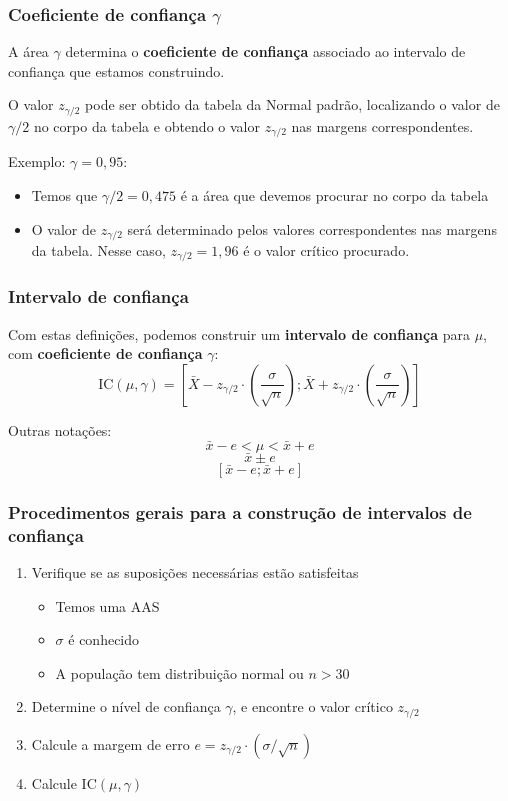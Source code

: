 \documentclass[11pt]{beamer}
\begin{document}
\begin{frame}
\frametitle{Coeficiente de confiança \(\gamma\)}

A área \(\gamma\) determina o \textbf{coeficiente de confiança}
associado ao intervalo de confiança que estamos construindo.

O valor \(z_{\gamma/2}\) pode ser obtido da tabela da Normal padrão,
localizando o valor de \(\gamma/2\) no corpo da tabela e obtendo o valor
\(z_{\gamma/2}\) nas margens correspondentes.

Exemplo: \(\gamma = 0,95\):

\begin{itemize}
\item
  Temos que \(\gamma/2 = 0,475\) é a área que devemos procurar no corpo
  da tabela
\item
  O valor de \(z_{\gamma/2}\) será determinado pelos valores
  correspondentes nas margens da tabela. Nesse caso,
  \(z_{\gamma/2} = 1,96\) é o valor crítico procurado.
\end{itemize}
\end{frame}

\begin{frame}
\frametitle{Intervalo de confiança}

Com estas definições, podemos construir um \textbf{intervalo de
confiança} para \(\mu\), com \textbf{coeficiente de confiança}
\(\gamma\): \[
\text{IC}(\mu, \gamma) = \left[ \bar{X} - z_{\gamma/2} \cdot
  \left(\frac{\sigma}{\sqrt{n}}\right) ; \bar{X} + z_{\gamma/2} \cdot
  \left(\frac{\sigma}{\sqrt{n}}\right)  \right]
\]

Outras notações: \[\bar{x} - e < \mu < \bar{x} + e\] \[\bar{x} \pm e\]
\[[\bar{x} - e; \bar{x} + e]\]
\end{frame}

\begin{frame}
\frametitle{Procedimentos gerais para a construção de intervalos de confiança}

\begin{enumerate}
\def\labelenumi{\arabic{enumi}.}
\item
  Verifique se as suposições necessárias estão satisfeitas

  \begin{itemize}
  \item
    Temos uma AAS
  \item
    \(\sigma\) é conhecido
  \item
    A população tem distribuição normal ou \(n>30\)
  \end{itemize}
\item
  Determine o nível de confiança \(\gamma\), e encontre o valor crítico
  \(z_{\gamma/2}\)
\item
  Calcule a margem de erro \(e = z_{\gamma/2} \cdot (\sigma/\sqrt{n})\)
\item
  Calcule \(\text{IC}(\mu, \gamma)\)
\end{enumerate}
\end{frame}
\end{document}
